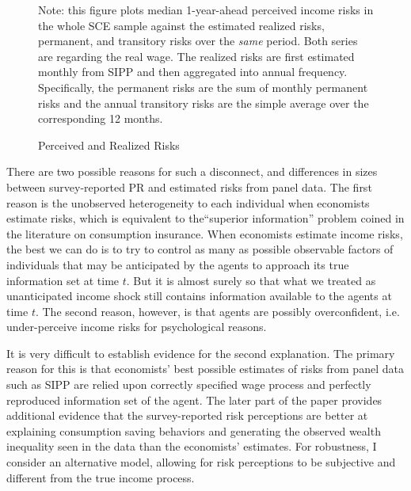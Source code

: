     \begin{figure}[!ht]
    	\caption{Perceived and Realized Risks}
    	\label{fig:ts_compare}
    	\begin{center}
    		\vbiskip
    	\vbiskip
    	\end{center}
    \begin{flushleft}Note: this figure plots median 1-year-ahead perceived income risks in the whole SCE sample against the estimated realized risks, permanent, and transitory risks over the \emph{same} period. Both series are regarding the real wage. The realized risks are first estimated monthly from SIPP and then aggregated into annual frequency. Specifically, the permanent risks are the sum of monthly permanent risks and the annual transitory risks are the simple average over the corresponding 12 months.\end{flushleft}
    \end{figure}


There are two possible reasons for such a disconnect, and differences in sizes between survey-reported PR and estimated risks from panel data. The first reason is the unobserved heterogeneity to each individual when economists estimate risks, which is equivalent to the``superior information'' problem coined in the literature on consumption insurance. When economists estimate income risks, the best we can do is to try to control as many as possible observable factors of individuals that may be anticipated by the agents to approach its true information set at time $t$. But it is almost surely so that what we treated as unanticipated income shock still contains information available to the agents at time $t$. The second reason, however, is that agents are possibly overconfident, i.e. under-perceive income risks for psychological reasons. 

It is very difficult to establish evidence for the second explanation. The primary reason for this is that economists' best possible estimates of risks from panel data such as SIPP are relied upon correctly specified wage process and perfectly reproduced information set of the agent. The later part of the paper provides additional evidence that the survey-reported risk perceptions are better at explaining consumption saving behaviors and generating the observed wealth inequality seen in the data than the economists' estimates. For robustness, I consider an alternative model, allowing for risk perceptions to be subjective and different from the true income process.